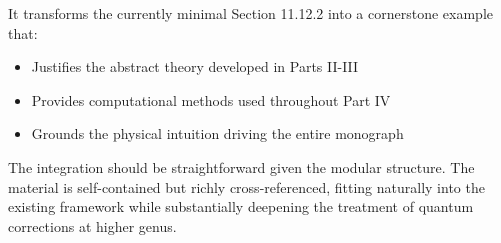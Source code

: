 It transforms the currently minimal Section 11.12.2 into a cornerstone example that:
\begin{itemize}
\item Justifies the abstract theory developed in Parts II-III
\item Provides computational methods used throughout Part IV
\item Grounds the physical intuition driving the entire monograph
\end{itemize}

The integration should be straightforward given the modular structure. The material is self-contained but richly cross-referenced, fitting naturally into the existing framework while substantially deepening the treatment of quantum corrections at higher genus.
